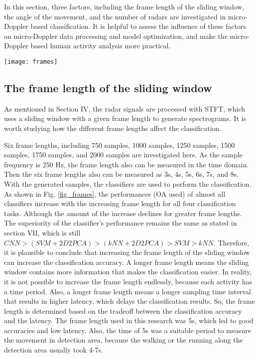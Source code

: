 In this section, three factors, including the frame length of the sliding window, the angle of the movement, and the number of radars are investigated in micro-Doppler based classification. It is helpful to assess the influence of these factors on micro-Doppler data processing and model optimization, and make the micro-Doppler based human activity analysis more practical.
\begin{figure*}[!ht]
         \centering
         \texttt{[image: frames]}
         \caption{Performances (OA) of the classifiers with the changing frame lengths}
         \label{fig_frames}
\end{figure*}
\subsection{The frame length of the sliding window}
As mentioned in Section IV, the radar signals are processed with STFT, which uses a sliding window with a given frame length to generate spectrograms. It is worth studying how the different frame lengths affect the classification. 

Six frame lengths, including 750 samples, 1000 samples, 1250 samples, 1500 samples, 1750 samples, and 2000 samples are investigated here. As the sample frequency is 250 Hz, the frame length also can be measured in the time domain. Then the six frame lengths also can be measured as 3s, 4s, 5s, 6s, 7s, and 8s. With the generated samples, the classifiers are used to perform the classification. As shown in Fig. \ref{fig_frames}, the performances (OA used) of almost all classifiers increase with the increasing frame length for all four classification tasks. Although the amount of the increase declines for greater frame lengths. The superiority of the classifier’s performance remains the same as stated in section VII, which is still $CNN>(SVM+2D2PCA)>(kNN+2D2PCA)>SVM>kNN$. Therefore, it is plausible to conclude that increasing the frame length of the sliding window can increase the classification accuracy. A longer frame length means the sliding window contains more information that makes the classification easier. In reality, it is not possible to increase the frame length endlessly, because each activity has a time period. Also, a longer frame length means a longer sampling time interval that results in higher latency, which delays the classification results. So, the frame length is determined based on the tradeoff between the classification accuracy and the latency. The frame length used in this research was 5s, which led to good accuracies and low latency. Also, the time of 5s was a suitable period to measure the movement in detection area, because the walking or the running along the detection area usually took 4-7s.

